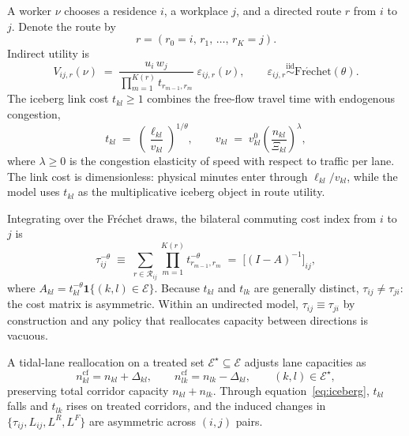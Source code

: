 \documentclass[12pt]{article}
\begin{document}
A worker $\nu$ chooses a residence $i$, a workplace $j$, and a directed route $r$ from $i$ to $j$. Denote the route by
\[
  r = (r_0{=}i,\, r_1,\,\dots,\, r_K{=}j).
\]
Indirect utility is
\begin{equation}
  V_{ij,r}(\nu) \;=\; \frac{u_i\, w_j}{\displaystyle\prod_{m=1}^{K(r)} t_{r_{m-1},r_m}}\; \varepsilon_{ij,r}(\nu), \qquad \varepsilon_{ij,r} \overset{\mathrm{iid}}{\sim} \mathrm{Fr\acute{e}chet}(\theta).
  \label{eq:utility}
\end{equation}
The iceberg link cost $t_{kl} \geq 1$ combines the free-flow travel time with endogenous congestion,
\begin{equation}
  t_{kl} \;=\; \left(\frac{\ell_{kl}}{v_{kl}}\right)^{\!1/\theta}, \qquad v_{kl} \;=\; v^0_{kl}\!\left(\frac{n_{kl}}{\Xi_{kl}}\right)^{\!\lambda},
  \label{eq:iceberg}
\end{equation}
where $\lambda \geq 0$ is the congestion elasticity of speed with respect to traffic per lane. The link cost is dimensionless: physical minutes enter through $\ell_{kl}/v_{kl}$, while the model uses $t_{kl}$ as the multiplicative iceberg object in route utility.

Integrating over the Fréchet draws, the bilateral commuting cost index from $i$ to $j$ is
\begin{equation}
  \tau_{ij}^{-\theta} \;\equiv\; \sum_{r \in \mathcal{R}_{ij}} \prod_{m=1}^{K(r)} t_{r_{m-1},r_m}^{-\theta} \;=\; \bigl[(I-A)^{-1}\bigr]_{ij},
  \label{eq:tau}
\end{equation}
where $A_{kl} = t_{kl}^{-\theta}\mathbf{1}\{(k,l)\in\mathcal{E}\}$. Because $t_{kl}$ and $t_{lk}$ are generally distinct, $\tau_{ij} \neq \tau_{ji}$: the cost matrix is asymmetric. Within an undirected model, $\tau_{ij} \equiv \tau_{ji}$ by construction and any policy that reallocates capacity between directions is vacuous.

A tidal-lane reallocation on a treated set $\mathcal{E}^\star \subseteq \mathcal{E}$ adjusts lane capacities as
\begin{equation}
  n_{kl}^{\mathrm{cf}} = n_{kl} + \Delta_{kl}, \qquad n_{lk}^{\mathrm{cf}} = n_{lk} - \Delta_{kl}, \qquad (k,l) \in \mathcal{E}^\star,
  \label{eq:tidallane}
\end{equation}
preserving total corridor capacity $n_{kl} + n_{lk}$. Through equation~\eqref{eq:iceberg}, $t_{kl}$ falls and $t_{lk}$ rises on treated corridors, and the induced changes in $\{\tau_{ij}, L_{ij}, L^R, L^F\}$ are asymmetric across $(i,j)$ pairs.
\end{document}
